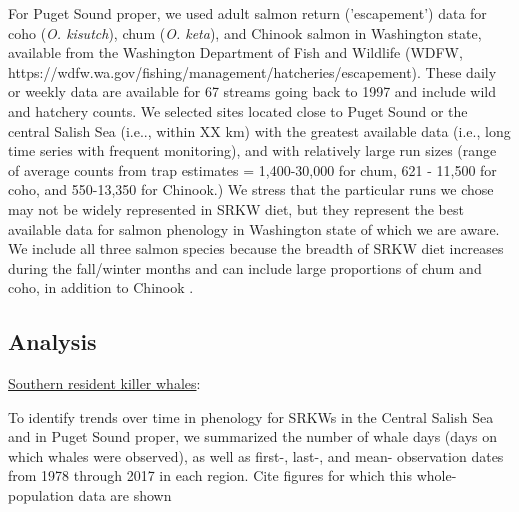 \documentclass{article}
\begin{document}
\par For Puget Sound proper, we used adult salmon return ('escapement') data for coho (\emph{O. kisutch}), chum (\emph{O. keta}), and Chinook salmon in Washington state, available from the Washington Department of Fish and Wildlife (WDFW, https://wdfw.wa.gov/fishing/management/hatcheries/escapement). These daily or weekly  data are available for 67 streams going back to 1997 and include wild and hatchery counts. We selected sites located close to Puget Sound or the central Salish Sea (i.e.., within XX km) with the greatest available data (i.e., long time series with frequent monitoring), and with relatively large run sizes (range of average counts from trap estimates = 1,400-30,000 for chum, 621 - 11,500 for coho, and 550-13,350 for Chinook.) We stress that the particular runs we chose may not be widely represented in SRKW diet, but they represent the best available data for salmon phenology in Washington state of which we are aware. %
We  include all three salmon species because the breadth of SRKW diet increases during the fall/winter months and can include large proportions of chum and coho, in addition to Chinook \citep{hanson2019,ford2016}.  

\subsection* {Analysis}
\underline{Southern resident killer whales}:
\par To identify trends over time in phenology for SRKWs in the Central Salish Sea and in Puget Sound proper, we summarized the number of whale days (days on which whales were observed), as well as first-, last-, and mean- observation dates from 1978 through 2017 in each region. Cite figures for which this whole-population data are shown
\end{document}
